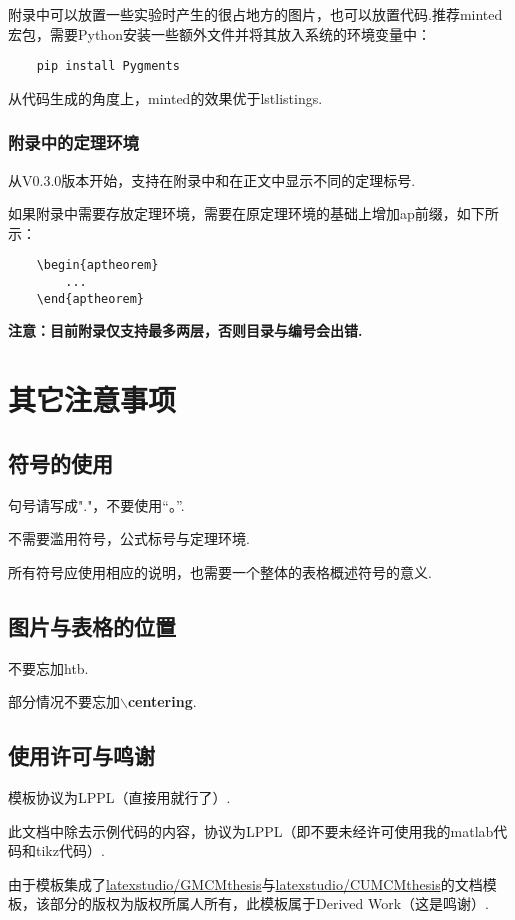 \documentclass[bwprint, withouttitlepage, openfonts]{mathexpthesis}
\begin{document}
附录中可以放置一些实验时产生的很占地方的图片，也可以放置代码.推荐minted宏包，需要Python安装一些额外文件并将其放入系统的环境变量中：
\begin{verbatim}
    pip install Pygments
\end{verbatim}

从代码生成的角度上，minted的效果优于lstlistings.

\subsubsection{附录中的定理环境}
从V0.3.0版本开始，支持在附录中和在正文中显示不同的定理标号.

如果附录中需要存放定理环境，需要在原定理环境的基础上增加ap前缀，如下所示：
\begin{verbatim}
    \begin{aptheorem}
        ...
    \end{aptheorem}
\end{verbatim}

\textbf{注意：目前附录仅支持最多两层，否则目录与编号会出错.}

\section{其它注意事项}
\subsection{符号的使用}
句号请写成"."，不要使用“。”.

不需要滥用符号，公式标号与定理环境.

所有符号应使用相应的说明，也需要一个整体的表格概述符号的意义.

\subsection{图片与表格的位置}
不要忘加htb.

部分情况不要忘加$\backslash$\textbf{centering}.

\subsection{使用许可与鸣谢}
模板协议为LPPL（直接用就行了）.

此文档中除去示例代码的内容，协议为LPPL（即不要未经许可使用我的matlab代码和tikz代码）.

由于模板集成了\href{https://github.com/latexstudio/GMCMthesis}{latexstudio/GMCMthesis}与\href{https://github.com/latexstudio/CUMCMthesis}{latexstudio/CUMCMthesis}的文档模板，该部分的版权为版权所属人所有，此模板属于Derived Work（这是鸣谢）.
\end{document}
